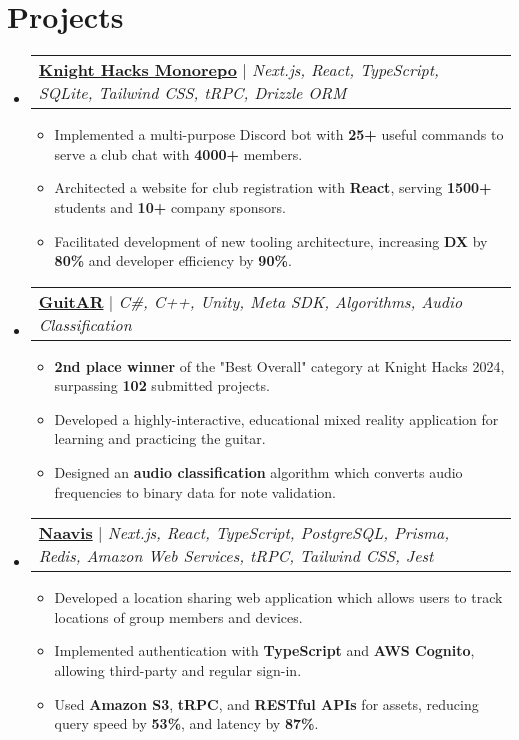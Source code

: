 \documentclass[letterpaper,11pt]{article}
\makeatletter
\newcommand{\resumeItem}[1]{
  \item\small{
    {#1 \vspace{-2pt}}
  }
}
\newcommand{\resumeProjectHeading}[2]{
    \item
    \begin{tabular*}{0.97\textwidth}{l@{\extracolsep{\fill}}r}
      \small#1\\
    \end{tabular*}\vspace{-7pt}
}
\newcommand{\resumeSubHeadingListStart}{\begin{itemize}[leftmargin=0.15in, label={}]}
\newcommand{\resumeSubHeadingListEnd}{\end{itemize}}
\newcommand{\resumeItemListStart}{\begin{itemize}}
\newcommand{\resumeItemListEnd}{\end{itemize}\vspace{-7pt}}
\makeatother
\begin{document}
\section{Projects}
    \resumeSubHeadingListStart
        \resumeProjectHeading
        {\textbf{\href{https://github.com/KnightHacks/forge}{Knight Hacks Monorepo}} $|$ \emph{Next.js, React, TypeScript, SQLite, Tailwind CSS, tRPC, Drizzle ORM}}{June 2021 -- Present}
        \resumeItemListStart
        \resumeItem{Implemented a multi-purpose Discord bot with \textbf{25+} useful commands to serve a club chat with \textbf{4000+} members.}
        \resumeItem{Architected a website for club registration with \textbf{React}, serving \textbf{1500+} students and \textbf{10+} company sponsors.}
        \resumeItem{Facilitated development of new tooling architecture, increasing \textbf{DX} by \textbf{80\%} and developer efficiency by \textbf{90\%}.}
        \resumeItemListEnd
        \resumeProjectHeading
        {\textbf{\href{https://devpost.com/software/guitar-o3gw19}{GuitAR}} $|$ \emph{C\#, C++, Unity, Meta SDK, Algorithms, Audio Classification }}{June 2021 -- Present}
        \resumeItemListStart
          \resumeItem{\textbf{2nd place winner} of the "Best Overall" category at Knight Hacks 2024, surpassing \textbf{102} submitted projects.}
          \resumeItem{Developed a highly-interactive, educational mixed reality application for learning and practicing the guitar.}
          \resumeItem{Designed an \textbf{audio classification} algorithm which converts audio frequencies to binary data for note validation.}
        \resumeItemListEnd
      \resumeProjectHeading
          {\textbf{\href{https://github.com/naavis-app/app}{Naavis}} $|$ \emph{Next.js, React, TypeScript, PostgreSQL, Prisma, Redis, Amazon Web Services, tRPC, Tailwind CSS, Jest}}{June 2021 -- Present}
          \resumeItemListStart
            \resumeItem{Developed a location sharing web application which allows users to track locations of group members and devices.}
            \resumeItem{Implemented authentication with \textbf{TypeScript} and \textbf{AWS Cognito}, allowing third-party and regular sign-in.}
            \resumeItem{Used \textbf{Amazon S3}, \textbf{tRPC}, and \textbf{RESTful APIs} for assets, reducing query speed by \textbf{53\%}, and latency by \textbf{87\%}.}
          \resumeItemListEnd
    \resumeSubHeadingListEnd
%

\end{document}
